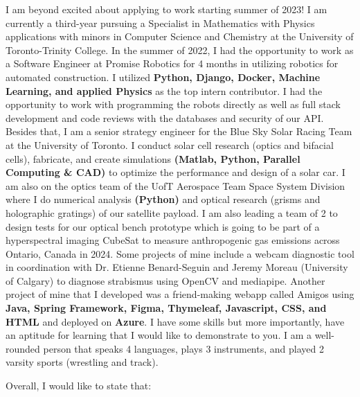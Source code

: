 \documentclass[11pt,a4]{article}
\begin{document}
I am beyond excited about applying to work starting summer of 2023! 
I am currently a third-year pursuing a Specialist in
 Mathematics with Physics applications with minors 
 in Computer Science and Chemistry at the University
  of Toronto-Trinity College. In the summer of 2022,
   I had the opportunity to work as a Software Engineer
    at Promise Robotics for 4 months in utilizing robotics
     for automated construction. I utilized \textbf{Python, Django,
      Docker, Machine Learning, and applied Physics} as the
       top intern contributor. I had the opportunity to work
        with programming the robots directly as well as full 
        stack development and code reviews with the databases and security of
         our API. Besides that, I am a senior strategy 
         engineer for the Blue Sky Solar Racing Team at 
         the University of Toronto. I conduct solar cell
          research (optics and bifacial cells), fabricate,
           and create simulations \textbf{(Matlab, Python, Parallel 
           Computing \& CAD)} to optimize the performance and
            design of a solar car. I am also on the optics 
            team of the UofT Aerospace Team Space System
             Division where I do numerical analysis \textbf{(Python)} 
             and optical research (grisms and holographic 
             gratings) of our satellite payload. I am also leading a team of 2 to 
             design tests for our optical bench prototype
              which is going to be part of a hyperspectral 
              imaging CubeSat to measure anthropogenic gas 
              emissions across Ontario, Canada in 2024.
               Some projects of mine include a webcam 
               diagnostic tool in coordination with Dr.
                Etienne Benard-Seguin and Jeremy Moreau
                 (University of Calgary) to diagnose 
                 strabismus using OpenCV and mediapipe. 
                 Another project of mine that I developed
                  was a friend-making webapp called Amigos
                   using \textbf{Java, Spring Framework, Figma, Thymeleaf, Javascript, CSS, and HTML} and deployed on \textbf{Azure}.
                    I have some skills but more importantly,
                     have an aptitude for learning that I 
                     would like to demonstrate to you. I am
                      a well-rounded person that speaks 4
                      languages, plays 3 instruments, and 
                      played 2 varsity sports (wrestling and 
                      track). \par
     Overall, I would like to state that:
\end{document}
